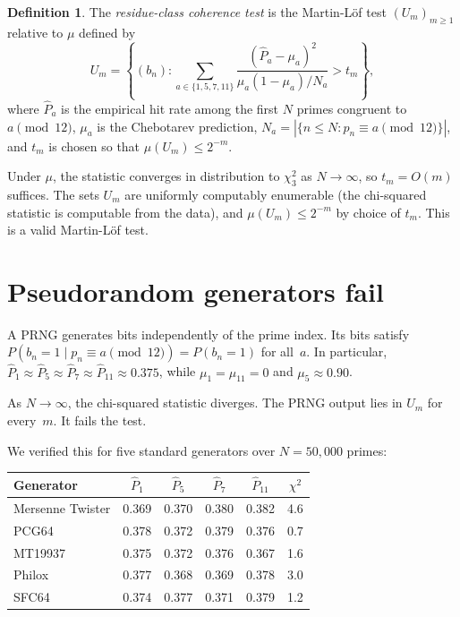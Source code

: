 \documentclass[11pt]{article}
\theoremstyle{definition}
\newtheorem{definition}[theorem]{Definition}
\theoremstyle{remark}
\begin{document}
\begin{definition}
The \emph{residue-class coherence test} is the
Martin-L\"of test $(U_m)_{m \geq 1}$ relative to $\mu$ defined by
\[
  U_m = \left\{ (b_n) :
    \sum_{a \in \{1,5,7,11\}}
    \frac{(\hat{P}_a - \mu_a)^2}{\mu_a(1-\mu_a) / N_a}
    > t_m \right\},
\]
where $\hat{P}_a$ is the empirical hit rate
among the first $N$ primes congruent to $a \pmod{12}$,
$\mu_a$ is the Chebotarev prediction,
$N_a = |\{n \leq N : p_n \equiv a \pmod{12}\}|$,
and $t_m$ is chosen so that $\mu(U_m) \leq 2^{-m}$.
\end{definition}

Under $\mu$, the statistic converges in distribution
to $\chi^2_3$ as $N \to \infty$,
so $t_m = O(m)$ suffices.
The sets $U_m$ are uniformly computably enumerable
(the chi-squared statistic is computable from the data),
and $\mu(U_m) \leq 2^{-m}$ by choice of $t_m$.
This is a valid Martin-L\"of test.

\section{Pseudorandom generators fail}

A PRNG generates bits independently of the prime index.
Its bits satisfy
$P(b_n = 1 \mid p_n \equiv a \pmod{12}) = P(b_n = 1)$
for all~$a$.  In particular, $\hat{P}_1 \approx \hat{P}_5
\approx \hat{P}_7 \approx \hat{P}_{11} \approx 0.375$,
while $\mu_1 = \mu_{11} = 0$ and $\mu_5 \approx 0.90$.

As $N \to \infty$, the chi-squared statistic diverges.
The PRNG output lies in $U_m$ for every~$m$.
It fails the test.

We verified this for five standard generators
over $N = 50{,}000$ primes:

\begin{center}
\begin{tabular}{lccccc}
\toprule
Generator & $\hat{P}_1$ & $\hat{P}_5$ & $\hat{P}_7$
  & $\hat{P}_{11}$ & $\chi^2$ \\
\midrule
Mersenne Twister   & 0.369 & 0.370 & 0.380 & 0.382 & 4.6 \\
PCG64              & 0.378 & 0.372 & 0.379 & 0.376 & 0.7 \\
MT19937            & 0.375 & 0.372 & 0.376 & 0.367 & 1.6 \\
Philox             & 0.377 & 0.368 & 0.369 & 0.378 & 3.0 \\
SFC64              & 0.374 & 0.377 & 0.371 & 0.379 & 1.2 \\
\bottomrule
\end{tabular}
\end{center}
\end{document}
